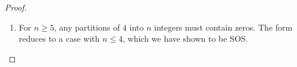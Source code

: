 \documentclass{article}
\begin{document}
\begin{proof}
\begin{itemize}
\begin{enumerate}
{\[\begin{bmatrix}
            0 & 0 & 0 & 0 & 0 & -0.04 & 0.01 & -0.01 & 0.01 & 0.05 & -0.01 & -0.02 & 0.01 & 0.01 & -0.04 \\
            0 & 0 & 0 & 0 & 0 & -0.04 & -0.04 & -0.04 & -0.01 & -0.01 & 0.25 & -0.04 & -0.04 & -0.01 & -0.04 \\
            0 & 0 & 0 & 0 & 0 & -0.01 & 0.01 & -0.04 & 0.01 & -0.02 & -0.04 & 0.05 & 0.01 & 0.01 & -0.01 \\
            0 & 0 & 0 & 0 & 0 & -0.04 & 0.01 & -0.01 & -0.02 & 0.01 & -0.04 & 0.01 & 0.05 & 0.01 & -0.01 \\
            0 & 0 & 0 & 0 & 0 & -0.04 & -0.02 & -0.04 & 0.01 & 0.01 & -0.01 & 0.01 & 0.01 & 0.05 & -0.01 \\
            0 & 0 & 0 & 0 & 0 & -0.04 & -0.04 & -0.04 & -0.04 & -0.04 & -0.04 & -0.01 & -0.01 & -0.01 & 0.25 \\
            \end{bmatrix}
         \]
         }
        For non-uniform weights with 
        $|\alpha|=4$ (e.g., $(2,1,1,0)$), the form effectively involves fewer than 4 variables, reducing to the $n \leq 3$ 
        case, which is SOS.
        \item For $n \geq 5$, any partitions of $4$ into $n$ integers must contain zeros. The form reduces to a case 
        with $n \leq 4$, which we have shown to be SOS.
    \end{enumerate}


\end{itemize}
\end{proof}
\end{document}
